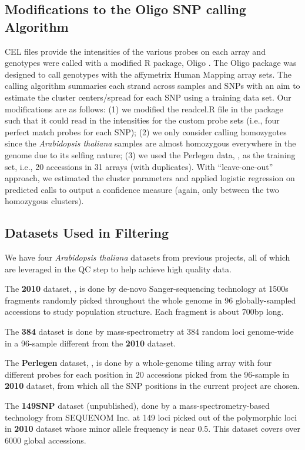 \documentclass[a4paper,10pt]{article}
\begin{document}
\subsection{Modifications to the Oligo SNP calling Algorithm}
\label{Oligo_calling}
CEL files provide the intensities of the various probes on each array and genotypes were called with a modified R package, Oligo \cite{Carvalho2007}.  The Oligo package was designed to call genotypes with the affymetrix Human Mapping array sets.  The calling algorithm summaries each strand across samples and SNPs with an aim to estimate the cluster centers/spread for each SNP using a training data set.  Our modifications are as follows: (1) we modified the readcel.R file in the package such that it could read in the intensities for the custom probe sets (i.e., four perfect match probes for each SNP); (2) we only consider calling homozygotes since the \textit{Arabidopsis thaliana} samples are almost homozygous everywhere in the genome due to its selfing nature; (3) we used the Perlegen data, \cite{Clark2007a}, as the training set, i.e., 20 accessions in 31 arrays (with duplicates). With “leave-one-out” approach, we estimated the cluster parameters and applied logistic regression on predicted calls to output a confidence measure (again, only between the two homozygous clusters).


\subsection{Datasets Used in Filtering}
We have four \textit{Arabidopsis thaliana} datasets from previous projects, all of which are leveraged in the QC step to help achieve high quality data.

The \textbf{2010} dataset, \cite{Nordborg2005}, is done by de-novo Sanger-sequencing technology at 1500s fragments randomly picked throughout the whole genome in 96 globally-sampled accessions to study population structure. Each fragment is about 700bp long.

The \textbf{384} dataset is done by mass-spectrometry at 384 random loci genome-wide in a 96-sample different from the \textbf{2010} dataset.

The \textbf{Perlegen} dataset, \cite{Clark2007a}, is done by a whole-genome tiling array with four different probes for each position in 20 accessions picked from the 96-sample in \textbf{2010} dataset, from which all the SNP positions in the current project are chosen.


The \textbf{149SNP} dataset (unpublished), done by a mass-spectrometry-based technology from SEQUENOM Inc. at 149 loci picked out of the polymorphic loci in \textbf{2010} dataset whose minor allele frequency is near 0.5. This dataset covers over 6000 global accessions.
\end{document}
